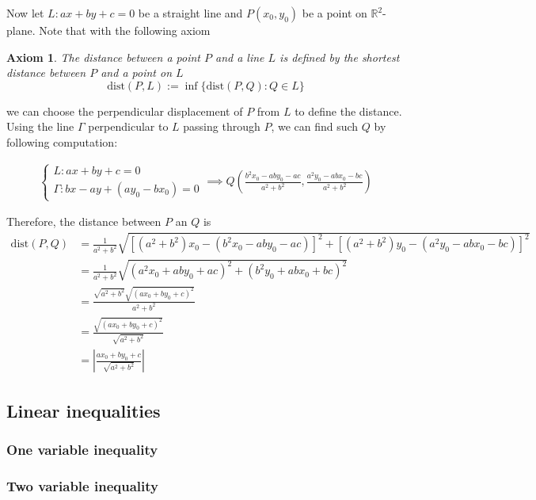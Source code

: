 \documentclass[12pt]{article}
\newtheorem*{axiom}{Axiom}
\begin{document}
    Now let $L:ax+by+c=0$ be a straight line and $P(x_0,y_0)$ be a point on $\mathbb{R}^2$-plane. Note that with the following axiom

    \begin{axiom}
        The distance between a point $P$ and a line $L$ is defined by the shortest distance between $P$ and a point on $L$ $$\mathrm{dist}(P,L):=\inf\{\mathrm{dist}(P,Q):Q\in L\}$$
    \end{axiom}

    we can choose the perpendicular displacement of $P$ from $L$ to define the distance. Using the line $\Gamma$ perpendicular to $L$ passing through $P$, we can find such $Q$ by following computation:

    \begin{align*}
        \begin{cases}
            L:ax+by+c=0\\
            \Gamma:bx-ay+(ay_0-bx_0)=0
        \end{cases}\implies Q(\frac{b^2x_0-aby_0-ac}{a^2+b^2},\frac{a^2y_0-abx_0-bc}{a^2+b^2})
    \end{align*}

    Therefore, the distance between $P$ an $Q$ is \begin{align*}
        \mathrm{dist}(P,Q)&=\frac{1}{a^2+b^2}\sqrt{[(a^2+b^2)x_0-(b^2x_0-aby_0-ac)]^2+[(a^2+b^2)y_0-(a^2y_0-abx_0-bc)]^2}\\
        &=\frac{1}{a^2+b^2}\sqrt{(a^2x_0+aby_0+ac)^2+(b^2y_0+abx_0+bc)^2}\\
        &=\frac{\sqrt{a^2+b^2}\sqrt{(ax_0+by_0+c)^2}}{a^2+b^2}\\
        &=\frac{\sqrt{(ax_0+by_0+c)^2}}{\sqrt{a^2+b^2}}\\
        &=\left|\frac{ax_0+by_0+c}{\sqrt{a^2+b^2}}\right|
    \end{align*}

    \subsection{Linear inequalities}

    \subsubsection*{One variable inequality}

    \subsubsection*{Two variable inequality}
\end{document}
